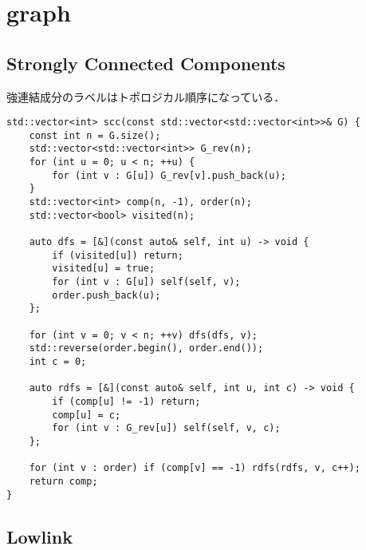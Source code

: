 \section{graph}

\subsection{Strongly Connected Components}

\begin{small}
    強連結成分のラベルはトポロジカル順序になっている．
\end{small}

\begin{lstlisting}
std::vector<int> scc(const std::vector<std::vector<int>>& G) {
    const int n = G.size();
    std::vector<std::vector<int>> G_rev(n);
    for (int u = 0; u < n; ++u) {
        for (int v : G[u]) G_rev[v].push_back(u);
    }
    std::vector<int> comp(n, -1), order(n);
    std::vector<bool> visited(n);

    auto dfs = [&](const auto& self, int u) -> void {
        if (visited[u]) return;
        visited[u] = true;
        for (int v : G[u]) self(self, v);
        order.push_back(u);
    };

    for (int v = 0; v < n; ++v) dfs(dfs, v);
    std::reverse(order.begin(), order.end());
    int c = 0;

    auto rdfs = [&](const auto& self, int u, int c) -> void {
        if (comp[u] != -1) return;
        comp[u] = c;
        for (int v : G_rev[u]) self(self, v, c);
    };

    for (int v : order) if (comp[v] == -1) rdfs(rdfs, v, c++);
    return comp;
}
\end{lstlisting}

\subsection{Lowlink}

